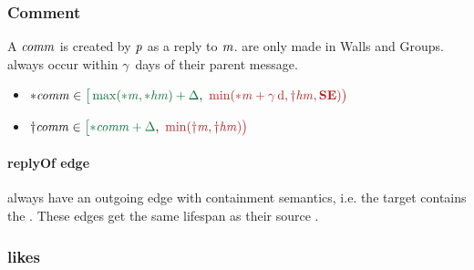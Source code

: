 

\subsubsection{Comment}

A \tComment $\mathit{comm}$ is created by \tPerson $\mathit{p}$ as a reply to \tMessage $\mathit{m}$. \tComments are only made in Walls and Groups. \tComment always occur within %
$\gamma$~days of their parent message. %

\begin{itemize}
    \item $\varc{\eComment} \in \interval{\max (\varc{\eMessage}, \varc{\eHasMember}) + \Delta}{\min (\varc{\eMessage} + \gamma\textrm{\,d}, \vard{\eHasMember}, \xSE)}$
    \item $\vard{\eComment} \in \interval{\varc{\eComment} + \Delta}{\min (\vard{\eMessage}, \vard{\eHasMember})}$
\end{itemize}

\paragraph{replyOf edge}

\tComments always have an outgoing \tReplyOf edge with containment semantics, i.e. the target \tMessage contains the \tComment. These edges get the same lifespan as their source \tComment.

\subsubsection{likes}
\label{sec:likes}

